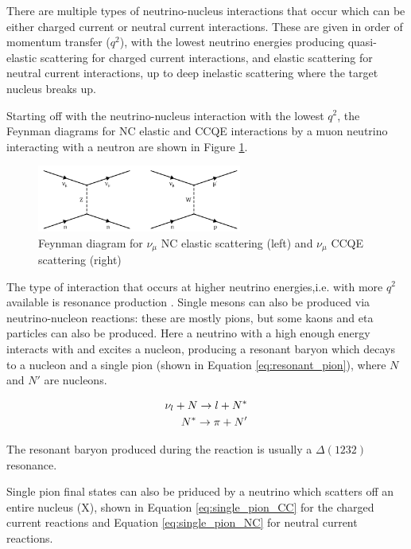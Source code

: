 There are multiple types of neutrino-nucleus interactions that occur which can be either charged current or neutral current interactions. These are given in order of momentum transfer ($q^2$), with the lowest neutrino energies producing quasi-elastic scattering for charged current interactions, and elastic scattering for neutral current interactions, up to deep inelastic scattering where the target nucleus breaks up. 

Starting off with the neutrino-nucleus interaction with the lowest $q^2$, the Feynman diagrams for NC elastic and CCQE interactions by a muon neutrino interacting with a neutron are shown in Figure \ref{fig:ncel_ccqe}. 

\begin{figure}
    \centering
    \includegraphics[width=0.6\textwidth]{Figures/ncel_ccqe.png}
    \caption{Feynman diagram for $\nu_{\mu}$ NC elastic scattering (left) and $\nu_{\mu}$ CCQE scattering (right)}
    \label{fig:ncel_ccqe}
\end{figure}

The type of interaction that occurs at higher neutrino energies,i.e. with more $q^2$ available is resonance production \cite{PhysRevD.69.014013}. Single mesons can also be produced via neutrino-nucleon reactions: these are mostly pions, but some kaons and eta particles can also be produced. Here a neutrino with a high enough energy interacts with and excites a nucleon, producing a resonant baryon which decays to a nucleon and a single pion (shown in Equation \ref{eq:resonant_pion}), where $N$ and $N'$ are nucleons.


\begin{align}
\nu_{l}+N \rightarrow l+N^{*}\label{eq:resonant_pion} \\
N^{*} \rightarrow \pi+N^{\prime} \notag
\end{align}


The resonant baryon produced during the reaction is usually a $\Delta(1232)$ resonance. 

Single pion final states can also be priduced by a neutrino which scatters off an entire nucleus (X), shown in Equation \ref{eq:single_pion_CC} for the charged current reactions and Equation \ref{eq:single_pion_NC} for neutral current reactions. 

